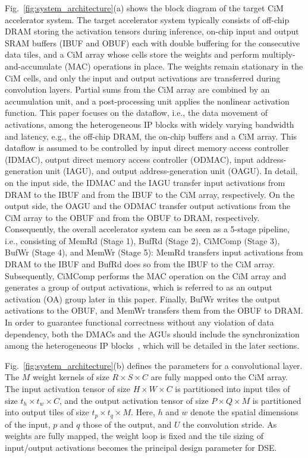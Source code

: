 \documentclass[lettersize,journal]{IEEEtran}
\begin{document}
Fig.~\ref{fig:system_architecture}(a) shows the block diagram of the target CiM accelerator system.
The target accelerator system typically consists of off-chip DRAM storing the activation tensors during inference, on-chip input and output SRAM buffers (IBUF and OBUF) each with double buffering for the consecutive data tiles, and a CiM array whose cells store the weights and perform multiply-and-accumulate (MAC) operations in place.
The weights remain stationary in the CiM cells, and only the input and output activations are transferred during convolution layers.
Partial sums from the CiM array are combined by an accumulation unit, and a post-processing unit applies the nonlinear activation function. This paper focuses on the dataflow, i.e., the data movement of activations, among the heterogeneous IP blocks with widely varying bandwidth and latency, e.g., the off-chip DRAM, the on-chip buffers and a CiM array. This dataflow is assumed to be controlled by input direct memory access controller (IDMAC), output direct memory access controller (ODMAC), input address-generation unit (IAGU), and output address-generation unit (OAGU). In detail, on the input side, the IDMAC and the IAGU transfer input activations from DRAM to the IBUF and from the IBUF to the CiM array, respectively. On the output side, the OAGU and the ODMAC transfer output activations from the CiM array to the OBUF and from the OBUF to DRAM, respectively. Consequently, the overall accelerator system can be seen as a 5-stage pipeline, i.e., consisting of MemRd (Stage 1), BufRd (Stage 2), CiMComp (Stage 3), BufWr (Stage 4), and MemWr (Stage 5): MemRd transfers input activations from DRAM to the IBUF and BufRd does so from the IBUF to the CiM array. Subsequently, CiMComp performs the MAC operation on the CiM array and generates a group of output activations, which is referred to as an output activation (OA) group later in this paper. Finally, BufWr writes the output activations to the OBUF, and MemWr transfers them from the OBUF to DRAM. In order to guarantee functional correctness without any violation of data dependency, both the DMACs and the AGUs should include the synchronization among the heterogeneous IP blocks~\cite{pellauer2019buffets}, which will be detailed in the later sections.

Fig.~\ref{fig:system_architecture}(b) defines the parameters for a convolutional layer.
The $M$ weight kernels of size $R \times S \times C$ are fully mapped onto the CiM array.
The input activation tensor of size $H \times W \times C$ is partitioned into input tiles of size $t_h \times t_w \times C$, and the output activation tensor of size $P \times Q \times M$ is partitioned into output tiles of size $t_p \times t_q \times M$.
Here, $h$ and $w$ denote the spatial dimensions of the input, $p$ and $q$ those of the output, and $U$ the convolution stride.
As weights are fully mapped, the weight loop is fixed and the tile sizing of input/output activations becomes the principal design parameter for DSE.
\end{document}
